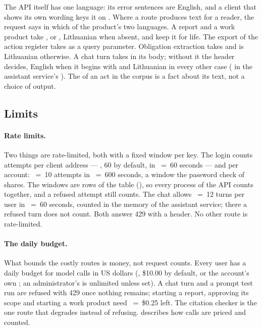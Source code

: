 The API itself has one language: its error sentences are English, and a client that shows its
own wording keys it on . Where a route produces text for a reader, the request says
in which of the product's two languages. A report and a work product take ,
 or , Lithuanian when absent, and keep it for life. The export of the action
register takes  as a query parameter. Obligation extraction takes
 and is Lithuanian otherwise. A chat turn takes  in its body;
without it the  header decides, English when it begins with  and
Lithuanian in every other case ( in the assistant service's
). The  of an act in the corpus is a fact about its text,
not a choice of output.

\subsection{Limits}\label{sec:api:limits}

\paragraph{Rate limits.} Two things are rate-limited, both with a fixed window per key. The
login counts attempts per client address --- , 60 by default, in
~=~60 seconds --- and per account: ~=~10 attempts in
~=~600 seconds, a window the password check of
 shares. The windows are rows of the table
 (), so every process of the API counts
together, and a refused attempt still counts. The chat allows ~=~12
turns per user in ~=~60 seconds, counted in the memory of the
assistant service; there a refused turn does not count. Both answer 429 
with a  header. No other route is rate-limited.

\paragraph{The daily budget.} What bounds the costly routes is money, not request counts. Every
user has a daily budget for model calls in US dollars (, \$10.00 by
default, or the account's own ; an administrator's is unlimited unless
set). A chat turn and a prompt test run are refused with 429  once
nothing remains; starting a report, approving its scope and starting a work product need
~=~\$0.25 left. The citation checker is the one route that
degrades instead of refusing.  describes how calls are priced and counted.

